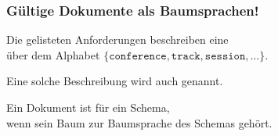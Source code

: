     \begin{frame}
      \frametitle{Gültige Dokumente als Baumsprachen!}

      Die gelisteten Anforderungen beschreiben eine \\
      über dem Alphabet $\{\texttt{conference},\texttt{track},\texttt{session},\dots\}$.

      \par\bigskip
      Eine solche Beschreibung wird auch  genannt.

      \par\bigskip
      Ein Dokument ist  für ein Schema,\\
      wenn sein Baum zur Baumsprache des Schemas gehört.

      \par\bigskip


    \end{frame}

